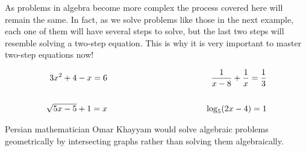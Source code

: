  As problems in algebra become more complex the process covered here will
remain the same. In fact, as we solve problems like those in the next example,
each one of them will have several steps to solve, but the last two steps will resemble solving a two-step equation. This is why it is very important
to master two-step equations now!

\begin{example}\label{Lin18}
 
  
  \begin{eqnarray*}
    3 x^2 + 4 - x = 6 & \mbox{\hspace{1.5in}} & \displaystyle\frac{1}{x - 8} + \displaystyle\frac{1}{x} = \displaystyle\frac{1}{3}\\
		 & & \\
		\sqrt{5 x -
    5} + 1 = x & \mbox{\hspace{1.5in}} & \log_5 (2 x - 4) = 1
  \end{eqnarray*}
\end{example}

 {} Persian mathematician Omar Khayyam would solve
algebraic problems geometrically by intersecting graphs rather than solving
them algebraically.

%
